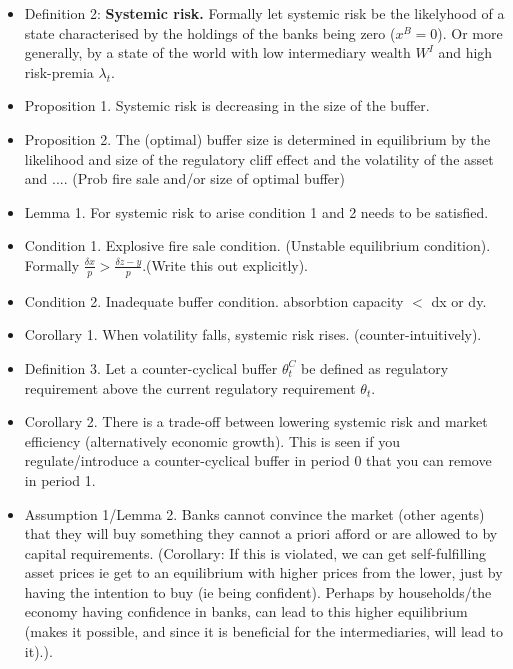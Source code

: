 \documentclass[11pt]{article}
\begin{document}
\begin{appendices}
\begin{itemize}
\item Definition 2: \textbf{Systemic risk.} Formally let systemic risk be the likelyhood of a state characterised by the holdings of the banks being zero ($x^B = 0$). Or more generally, by a state of the world with low intermediary wealth $W^I$ and high risk-premia $\lambda_t$.

\item Proposition 1. Systemic risk is decreasing in the size of the buffer.

\item Proposition 2. The (optimal) buffer size is determined in equilibrium by the likelihood and size of the regulatory cliff effect and the volatility of the asset and .... 
(Prob fire sale and/or size of optimal buffer)

\item Lemma 1. For systemic risk to arise condition 1 and 2 needs to be satisfied.

\item Condition 1. Explosive fire sale condition. (Unstable equilibrium condition). Formally $\frac{\delta x}{p} > \frac{\delta z-y}{p}$.(Write this out explicitly).

\item Condition 2. Inadequate buffer condition. absorbtion capacity $<$ dx or dy.

\item Corollary 1. When volatility falls, systemic risk rises. (counter-intuitively).

\item Definition 3. Let a counter-cyclical buffer $\theta^C_t$ be defined as regulatory requirement above the current regulatory requirement $\theta_t$.

\item Corollary 2. There is a trade-off between lowering systemic risk and market efficiency (alternatively economic growth). This is seen if you regulate/introduce a counter-cyclical buffer in period 0 that you can remove in period 1.

\item Assumption 1/Lemma 2. Banks cannot convince the market (other agents) that they will buy something they cannot a priori afford or are allowed to by capital requirements. (Corollary: If this is violated, we can get self-fulfilling asset prices ie get to an equilibrium with higher prices from the lower, just by having the intention to buy (ie being confident). Perhaps by households/the economy having confidence in banks, can lead to this higher equilibrium (makes it possible, and since it is beneficial for the intermediaries, will lead to it).). 


\end{itemize}
\end{appendices}
\end{document}
